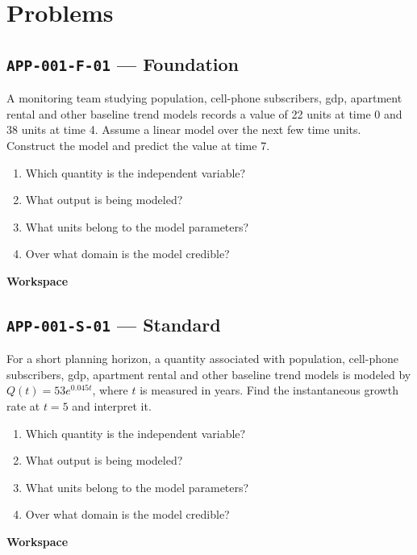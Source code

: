 \documentclass[11pt]{book}
\newcommand{\pid}[1]{\texttt{#1}}
\newcommand{\workspace}{\par\vspace{0.7in}\hrulefill\par\vspace{0.55in}\hrulefill\par}
\begin{document}
\section*{Problems}
\subsection*{\pid{APP-001-F-01} — Foundation}
\begin{problembox}
A monitoring team studying population, cell-phone subscribers, gdp, apartment rental and other baseline trend models records a value of 22 units at time 0 and 38 units at time 4. Assume a linear model over the next few time units. Construct the model and predict the value at time 7.
\end{problembox}
\begin{promptbox}\begin{enumerate}
\item Which quantity is the independent variable?
\item What output is being modeled?
\item What units belong to the model parameters?
\item Over what domain is the model credible?
\end{enumerate}\end{promptbox}
\textbf{Workspace}\workspace
{}
\subsection*{\pid{APP-001-S-01} — Standard}
\begin{problembox}
For a short planning horizon, a quantity associated with population, cell-phone subscribers, gdp, apartment rental and other baseline trend models is modeled by $Q(t)=53e^{0.045t}$, where $t$ is measured in years. Find the instantaneous growth rate at $t=5$ and interpret it.
\end{problembox}
\begin{promptbox}\begin{enumerate}
\item Which quantity is the independent variable?
\item What output is being modeled?
\item What units belong to the model parameters?
\item Over what domain is the model credible?
\end{enumerate}\end{promptbox}
\textbf{Workspace}\workspace
{}
\end{document}
